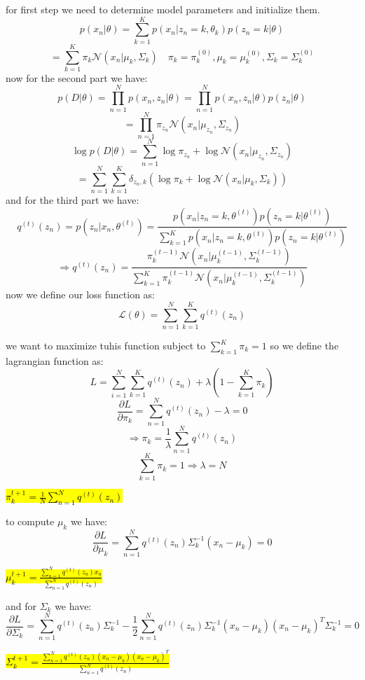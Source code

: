 \begin{qsolve}
    \begin{qsolve}[]
        for first step we need to determine model parameters and initialize them.
        $$p(x_n|\theta) = \sum_{k=1}^{K} p(x_n|z_n=k,\theta_k)p(z_n=k|\theta)$$
        $$= \sum_{k=1}^{K} \pi_k \mathcal{N}(x_n|\mu_k,\Sigma_k) \quad \pi_k = \pi_k^{(0)} , \mu_k = \mu_k^{(0)} , \Sigma_k = \Sigma_k^{(0)}$$
        now for the second part we have:
        $$p(D|\theta) = \prod_{n=1}^{N} p(x_n, z_n|\theta) = \prod_{n=1}^{N} p(x_n,z_n|\theta)p(z_n|\theta)$$
        $$= \prod_{n=1}^{N} \pi_{z_n} \mathcal{N}(x_n|\mu_{z_n},\Sigma_{z_n})$$
        $$\log p(D|\theta) = \sum_{n=1}^{N} \log \pi_{z_n} + \log \mathcal{N}(x_n|\mu_{z_n},\Sigma_{z_n})$$
        $$= \sum_{n=1}^{N} \sum_{k=1}^{K} \delta_{z_n,k} (\log \pi_k + \log \mathcal{N}(x_n|\mu_k,\Sigma_k))$$
        and for the third part we have:
        $$q^{(t)}(z_n) = p(z_n|x_n,\theta^{(t)}) = \frac{p(x_n|z_n=k , \theta^{(t)})p(z_n=k|\theta^{(t)})}{\sum_{k=1}^{K} p(x_n|z_n=k , \theta^{(t)})p(z_n=k|\theta^{(t)})}$$        
        $$\Rightarrow q^{(t)}(z_n) = \frac{\pi_k^{(t-1)} \mathcal{N}(x_n|\mu_k^{(t-1)},\Sigma_k^{(t-1)})}{\sum_{k=1}^{K} \pi_k^{(t-1)} \mathcal{N}(x_n|\mu_k^{(t-1)},\Sigma_k^{(t-1)})}$$
        \splitqsolve[\splitqsolve]
        now we define our loss function as:
        $$\mathcal{L}(\theta) = \sum_{n=1}^{N} \sum_{k=1}^{K} q^{(t)}(z_n) $$
        
        we want to maximize tuhis function subject to $\sum_{k=1}^{K}\pi_k = 1$ so we define the lagrangian function as:
        $$L = \sum_{i=1}^{N} \sum_{k=1}^{K} q^{(t)}(z_n) + \lambda(1- \sum_{k=1}^{K}\pi_k)$$
        $$\frac{\partial L}{\partial \pi_k} = \sum_{n=1}^{N} q^{(t)}(z_n) - \lambda = 0$$
        $$\Rightarrow \pi_k = \frac{1}{\lambda} \sum_{n=1}^{N} q^{(t)}(z_n)$$
        $$\sum_{k=1}^{K} \pi_k = 1 \Rightarrow \lambda = N$$
        \begin{center}
            \hl{$\pi_k^{t+1} = \frac{1}{N} \sum_{n=1}^{N} q^{(t)}(z_n)$}
        \end{center}
        to compute $\mu_k$ we have:
        $$\frac{\partial L}{\partial \mu_k} = \sum_{n=1}^{N} q^{(t)}(z_n) \Sigma_k^{-1} (x_n - \mu_k) = 0$$
        \begin{center}
            \hl{$\mu_k^{t+1} = \frac{\sum_{n=1}^{N} q^{(t)}(z_n) x_n}{\sum_{n=1}^{N} q^{(t)}(z_n)}$}
        \end{center}
        and for $\Sigma_k$ we have:
        $$\frac{\partial L}{\partial \Sigma_k} = \sum_{n=1}^{N} q^{(t)}(z_n) \Sigma_k^{-1} - \frac{1}{2} \sum_{n=1}^{N} q^{(t)}(z_n) \Sigma_k^{-1} (x_n - \mu_k)(x_n - \mu_k)^T \Sigma_k^{-1} = 0$$
        \begin{center}
            \hl{$\Sigma_k^{t+1} = \frac{\sum_{n=1}^{N} q^{(t)}(z_n) (x_n - \mu_k)(x_n - \mu_k)^T}{\sum_{n=1}^{N} q^{(t)}(z_n)}$}
        \end{center}
        
    \end{qsolve}
\end{qsolve}
